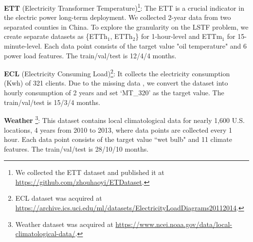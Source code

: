 \documentclass[letterpaper]{article} %
\begin{document}
\textbf{ETT} (Electricity Transformer Temperature)\footnote{We collected the ETT dataset and published it at \url{https://github.com/zhouhaoyi/ETDataset}.}:
The ETT is a crucial indicator in the electric power long-term deployment.
We collected 2-year data from two separated counties in China. To explore the granularity on the LSTF problem, we create separate datasets as \{ETTh$_1$, ETTh$_2$\} for 1-hour-level and ETTm$_1$ for 15-minute-level.
Each data point consists of the target value "oil temperature" and 6 power load features.
The train/val/test is 12/4/4 months.

\textbf{ECL} (Electricity Consuming Load)\footnote{ECL dataset was acquired at \url{https://archive.ics.uci.edu/ml/datasets/ElectricityLoadDiagrams20112014}.}: It collects the electricity consumption (Kwh) of 321 clients. Due to the missing data \cite{li2019enhancing}, we convert the dataset into hourly consumption of 2 years and set `MT\_320' as the target value. The train/val/test is 15/3/4 months.

\textbf{Weather} \footnote{Weather dataset was acquired at \url{https://www.ncei.noaa.gov/data/local-climatological-data/}.}: This dataset contains local climatological data for nearly 1,600 U.S. locations, 4 years from 2010 to 2013, where data points are collected every 1 hour. Each data point consists of the target value ``wet bulb" and 11 climate features. The train/val/test is 28/10/10 months.

\end{document}
